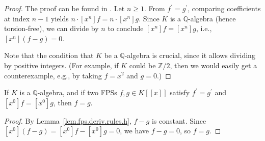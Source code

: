 \begin{proof}
\leanok
The proof can be found in \cite[Lemma 0.3]{logexp}.
Let $n \geq 1$. From $f^{\prime} = g^{\prime}$, comparing coefficients at index
$n - 1$ yields $n \cdot [x^n]f = n \cdot [x^n]g$. Since $K$ is a $\mathbb{Q}$-algebra
(hence torsion-free), we can divide by $n$ to conclude $[x^n]f = [x^n]g$,
i.e., $[x^n](f - g) = 0$.

Note that the condition that $K$ be a $\mathbb{Q}$-algebra is crucial, since
it allows dividing by positive integers. (For example, if $K$ could be
$\mathbb{Z}/2$, then we would easily get a counterexample, e.g., by taking
$f=x^{2}$ and $g=0$.)
\end{proof}

\begin{lemma}
\label{lem.fps.deriv.eq-of-deriv-eq-const-eq}
\leanhelper
\leanok
If $K$ is a $\mathbb{Q}$-algebra, and if two FPSs $f,g\in
K\left[  \left[  x\right]  \right]  $ satisfy $f^{\prime}=g^{\prime}$ and
$[x^0]f = [x^0]g$, then $f = g$.
\end{lemma}

\begin{proof}
\leanok
By Lemma~\ref{lem.fps.deriv.rules.h}, $f - g$ is constant. Since
$[x^0](f - g) = [x^0]f - [x^0]g = 0$, we have $f - g = 0$, so $f = g$.
\end{proof}
